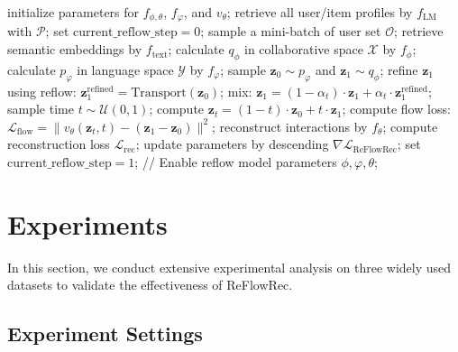 \documentclass[sigconf]{acmart}
\begin{document}
\begin{algorithm}
\caption{The training process of \textsf{ReFlowRec}}
\label{algorithm_reflowrec}
\begin{algorithmic}[1]
\STATE initialize parameters for $f_{\phi, \theta}$, $f_\varphi$, and $v_\theta$;
\STATE retrieve all user/item profiles by $f_{\text{LM}}$ with $\mathcal P$;
\STATE set $\text{current\_reflow\_step} = 0$;
\STATE sample a mini-batch of user set $\mathcal O$;
\STATE retrieve semantic embeddings by $f_{\text{text}}$;
\STATE calculate $q_{\phi}$ in collaborative space $\mathcal X$ by $f_{\phi}$;
\STATE calculate $p_{\varphi}$ in language space $\mathcal Y$ by $f_\varphi$;
\STATE sample $\mathbf z_0 \sim p_{\varphi}$ and $\mathbf z_1 \sim q_{\phi}$;
\STATE refine $\mathbf z_1$ using reflow: $\mathbf z_1^{\text{refined}} = \text{Transport}(\mathbf z_0)$;
\STATE mix: $\mathbf z_1 = (1-\alpha_t) \cdot \mathbf z_1 + \alpha_t \cdot \mathbf z_1^{\text{refined}}$;
\ENDIF
\STATE sample time $t \sim \mathcal U(0,1)$;
\STATE compute $\mathbf z_t = (1-t) \cdot \mathbf z_0 + t \cdot \mathbf z_1$;
\STATE compute flow loss: $\mathcal L_{\text{flow}} = \|v_\theta(\mathbf z_t, t) - (\mathbf z_1 - \mathbf z_0)\|^2$;
\STATE reconstruct interactions by $f_{\theta}$;
\STATE compute reconstruction loss $\mathcal L_{\text{rec}}$;
\ENDFOR
\STATE update parameters by descending $\nabla \mathcal L_{\text{ReFlowRec}}$;
\STATE set $\text{current\_reflow\_step} = 1$; // Enable reflow
\ENDIF
\ENDWHILE
\RETURN model parameters $\phi, \varphi, \theta$;
\end{algorithmic}
\end{algorithm}

\section{Experiments}
In this section, we conduct extensive experimental analysis on three widely used datasets to validate the effectiveness of \textsf{ReFlowRec}.

\subsection{Experiment Settings}
\end{document}
